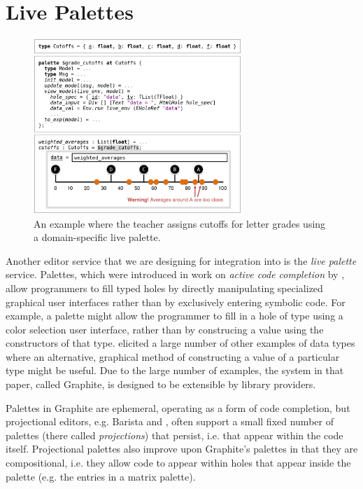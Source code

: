 
\section{Live Palettes}
\label{sec:palettes}


\begin{figure}[t]
\vspace{-4px}
\includegraphics[width=0.7\textwidth]{images/cutoffs-new.png}
\caption{An example where the teacher assigns cutoffs 
for letter grades using a domain-specific live palette.}
\label{fig:cutoffs-example}
\vspace{-4px}
\end{figure}

Another editor service that we are designing for integration into \Hazel 
is the \emph{live palette} service.
Palettes, which were introduced in work on
\emph{active code completion} by \citet{ActiveCodeCompletion},  allow programmers to fill typed 
holes by directly manipulating specialized graphical user interfaces rather than by exclusively entering symbolic
code. For example, a palette might allow the programmer to 
fill in a hole of type  using a color selection  
user interface, rather than by construcing a  value  
using the constructors of that type. \citet{ActiveCodeCompletion} elicited a large number of other
examples of data types where an alternative, graphical 
method of constructing a value of a particular type might be
useful. Due to the large number of examples, the system in that paper, called {Graphite}, is designed to be extensible by library providers. 

Palettes in {Graphite} 
are ephemeral, operating as a form of code completion, but projectional editors, e.g. Barista \cite{ko_barista:_2006} and  \cite{voelter_mbeddr:_2012}, often support a small fixed number of  
palettes (there called \emph{projections}) that persist, i.e. that appear within the code itself. 
Projectional palettes also improve upon Graphite's palettes in that they are compositional, i.e. they allow code to appear within holes that appear inside the palette (e.g. the entries in a matrix palette). 


